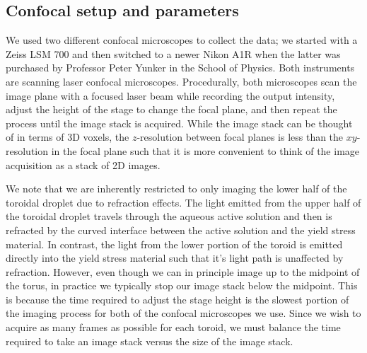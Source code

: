 \subsection{Confocal setup and parameters}
We used two different confocal microscopes to collect the data; we started with a Zeiss LSM 700 and then switched to a newer Nikon A1R when the latter was purchased by Professor Peter Yunker in the School of Physics.
Both instruments are scanning laser confocal microscopes.
Procedurally, both microscopes scan the image plane with a focused laser beam while recording the output intensity, adjust the height of the stage to change the focal plane, and then repeat the process until the image stack is acquired.
While the image stack can be thought of in terms of 3D voxels, the $z$-resolution between focal planes is less than the $xy$-resolution in the focal plane such that it is more convenient to think of the image acquisition as a stack of 2D images.

We note that we are inherently restricted to only imaging the lower half of the toroidal droplet due to refraction effects.
The light emitted from the upper half of the toroidal droplet travels through the aqueous active solution and then is refracted by the curved interface between the active solution and the yield stress material.
In contrast, the light from the lower portion of the toroid is emitted directly into the yield stress material such that it's light path is unaffected by refraction.
However, even though we can in principle image up to the midpoint of the torus, in practice we typically stop our image stack below the midpoint.
This is because the time required to adjust the stage height is the slowest portion of the imaging process for both of the confocal microscopes we use.
Since we wish to acquire as many frames as possible for each toroid, we must balance the time required to take an image stack versus the size of the image stack.

